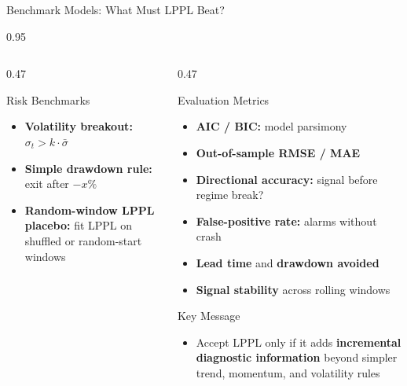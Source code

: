 \documentclass[9pt, aspectratio=169, t]{beamer}
\begin{document}
\begin{frame}{Benchmark Models: What Must LPPL Beat?}
\begin{cminipage}{0.95\textwidth}
{\begin{columns}[T]
\begin{column}{0.47\textwidth}
            \begin{exampleblock}{Risk Benchmarks}
                \begin{itemize}\setlength{\itemsep}{1pt}
                    \item \textbf{Volatility breakout:} $\sigma_t > k \cdot \bar{\sigma}$
                    \item \textbf{Simple drawdown rule:} exit after $-x\%$
                    \item \textbf{Random-window LPPL placebo:} fit LPPL on shuffled or random-start windows
                \end{itemize}
            \end{exampleblock}
        \end{column}
        \begin{column}{0.47\textwidth}
            \begin{alertblock}{Evaluation Metrics}
                \begin{itemize}\setlength{\itemsep}{0pt}
                    \item \textbf{AIC / BIC:} model parsimony
                    \item \textbf{Out-of-sample RMSE / MAE}
                    \item \textbf{Directional accuracy:} signal before regime break?
                    \item \textbf{False-positive rate:} alarms without crash
                    \item \textbf{Lead time} and \textbf{drawdown avoided}
                    \item \textbf{Signal stability} across rolling windows
                \end{itemize}
            \end{alertblock}
            \vspace{-2mm}
            \begin{block}{Key Message}
                \begin{itemize}\setlength{\itemsep}{0pt}
                    \item Accept LPPL only if it adds \textbf{incremental diagnostic information} beyond simpler trend, momentum, and volatility rules
                \end{itemize}
            \end{block}
        \end{column}
    \end{columns}
    }
    \end{cminipage}
\end{frame}
\end{document}
